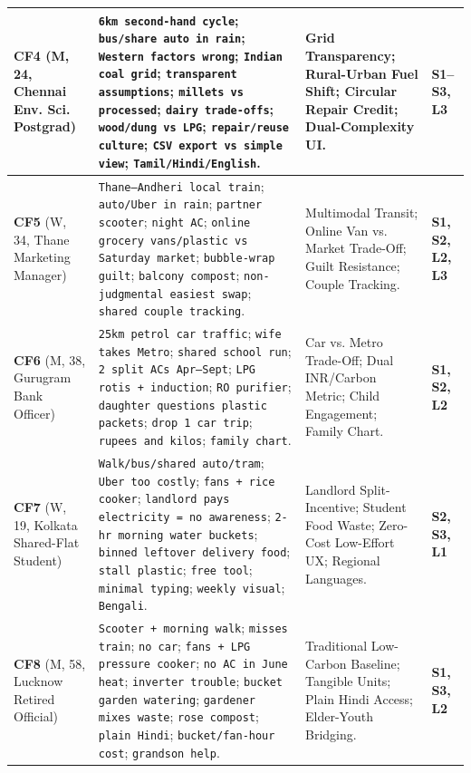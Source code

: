 \documentclass[12pt, a4paper]{article}
\begin{document}
{\begin{longtable}{|>{\raggedright\arraybackslash}p{3.0cm}|>{\raggedright\arraybackslash}p{7.1cm}|>{\raggedright\arraybackslash}p{3.7cm}|>{\raggedright\arraybackslash}p{1.9cm}|}
\textbf{CF4} \cite{cf4} (M, 24, Chennai Env. Sci. Postgrad) & 
\texttt{6km second-hand cycle}; \texttt{bus/share auto in rain}; \texttt{Western factors wrong}; \texttt{Indian coal grid}; \texttt{transparent assumptions}; \texttt{millets vs processed}; \texttt{dairy trade-offs}; \texttt{wood/dung vs LPG}; \texttt{repair/reuse culture}; \texttt{CSV export vs simple view}; \texttt{Tamil/Hindi/English}. & 
Grid Transparency; Rural-Urban Fuel Shift; Circular Repair Credit; Dual-Complexity UI. & 
\textbf{S1--S3, L3} \\
\hline

\textbf{CF5} \cite{cf5} (W, 34, Thane Marketing Manager) & 
\texttt{Thane--Andheri local train}; \texttt{auto/Uber in rain}; \texttt{partner scooter}; \texttt{night AC}; \texttt{online grocery vans/plastic vs Saturday market}; \texttt{bubble-wrap guilt}; \texttt{balcony compost}; \texttt{non-judgmental easiest swap}; \texttt{shared couple tracking}. & 
Multimodal Transit; Online Van vs. Market Trade-Off; Guilt Resistance; Couple Tracking. & 
\textbf{S1, S2, L2, L3} \\
\hline

\textbf{CF6} \cite{cf6} (M, 38, Gurugram Bank Officer) & 
\texttt{25km petrol car traffic}; \texttt{wife takes Metro}; \texttt{shared school run}; \texttt{2 split ACs Apr--Sept}; \texttt{LPG rotis + induction}; \texttt{RO purifier}; \texttt{daughter questions plastic packets}; \texttt{drop 1 car trip}; \texttt{rupees and kilos}; \texttt{family chart}. & 
Car vs. Metro Trade-Off; Dual INR/Carbon Metric; Child Engagement; Family Chart. & 
\textbf{S1, S2, L2} \\
\hline

\textbf{CF7} \cite{cf7} (W, 19, Kolkata Shared-Flat Student) & 
\texttt{Walk/bus/shared auto/tram}; \texttt{Uber too costly}; \texttt{fans + rice cooker}; \texttt{landlord pays electricity = no awareness}; \texttt{2-hr morning water buckets}; \texttt{binned leftover delivery food}; \texttt{stall plastic}; \texttt{free tool}; \texttt{minimal typing}; \texttt{weekly visual}; \texttt{Bengali}. & 
Landlord Split-Incentive; Student Food Waste; Zero-Cost Low-Effort UX; Regional Languages. & 
\textbf{S2, S3, L1} \\
\hline

\textbf{CF8} \cite{cf8} (M, 58, Lucknow Retired Official) & 
\texttt{Scooter + morning walk}; \texttt{misses train}; \texttt{no car}; \texttt{fans + LPG pressure cooker}; \texttt{no AC in June heat}; \texttt{inverter trouble}; \texttt{bucket garden watering}; \texttt{gardener mixes waste}; \texttt{rose compost}; \texttt{plain Hindi}; \texttt{bucket/fan-hour cost}; \texttt{grandson help}. & 
Traditional Low-Carbon Baseline; Tangible Units; Plain Hindi Access; Elder-Youth Bridging. & 
\textbf{S1, S3, L2} \\
\hline


\end{longtable}}
\end{document}
